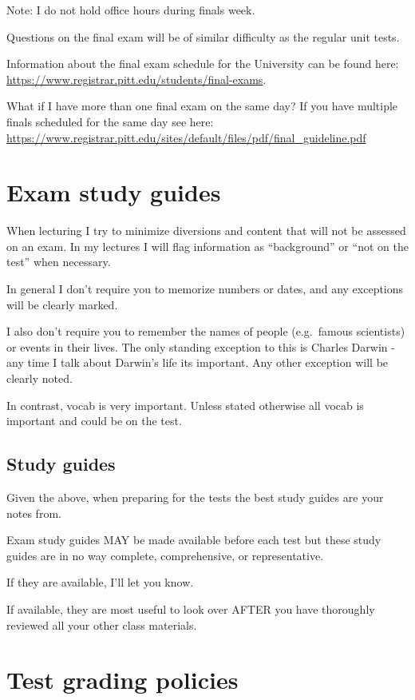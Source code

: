 \documentclass[
]{book}
\begin{document}
Note: I do not hold office hours during finals week.

Questions on the final exam will be of similar difficulty as the regular unit tests.

Information about the final exam schedule for the University can be found here:
\url{https://www.registrar.pitt.edu/students/final-exams}.

What if I have more than one final exam on the same day?
If you have multiple finals scheduled for the same day see here:
\url{https://www.registrar.pitt.edu/sites/default/files/pdf/final_guideline.pdf}

\hypertarget{exam-study-guides}{%
\chapter{Exam study guides}\label{exam-study-guides}}

When lecturing I try to minimize diversions and content that will not be assessed on an exam. In my lectures I will flag information as ``background'' or ``not on the test'' when necessary.

In general I don't require you to memorize numbers or dates, and any exceptions will be clearly marked.

I also don't require you to remember the names of people (e.g.~famous scientists) or events in their lives. The only standing exception to this is Charles Darwin - any time I talk about Darwin's life its important. Any other exception will be clearly noted.

In contrast, vocab is very important. Unless stated otherwise all vocab is important and could be on the test.

\hypertarget{study-guides}{%
\section{Study guides}\label{study-guides}}

Given the above, when preparing for the tests the best study guides are your notes from.

Exam study guides MAY be made available before each test but these study guides are in no way complete, comprehensive, or representative.

If they are available, I'll let you know.

If available, they are most useful to look over AFTER you have thoroughly reviewed all your other class materials.

\hypertarget{test-grading-policies}{%
\chapter{Test grading policies}\label{test-grading-policies}}
\end{document}
